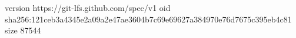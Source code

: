 version https://git-lfs.github.com/spec/v1
oid sha256:121ceb3a4345e2a09a2e47ae3604b7c69e69627a384970e76d7675c395eb4c81
size 87544
